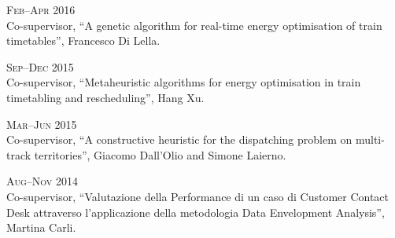 \begin{paracol}{2}
  \textsc{Feb--Apr 2016}
\switchcolumn
  \\
  Co-supervisor, ``A genetic algorithm for real-time energy optimisation of train timetables'', Francesco Di Lella.
\end{paracol}

\begin{paracol}{2}
  \textsc{Sep--Dec 2015}
\switchcolumn
  \\
  Co-supervisor, ``Metaheuristic algorithms for energy optimisation in train timetabling and rescheduling'', Hang Xu.
\end{paracol}

\begin{paracol}{2}
  \textsc{Mar--Jun 2015}
\switchcolumn
  \\
  Co-supervisor, ``A constructive heuristic for the dispatching problem on multi-track territories'', Giacomo Dall'Olio and Simone Laierno.
\end{paracol}

\begin{paracol}{2}
  \textsc{Aug--Nov 2014}
\switchcolumn
  \\
  Co-supervisor, ``Valutazione della Performance di un caso di Customer Contact Desk attraverso l'applicazione della metodologia Data Envelopment Analysis'', Martina Carli.
\end{paracol}
